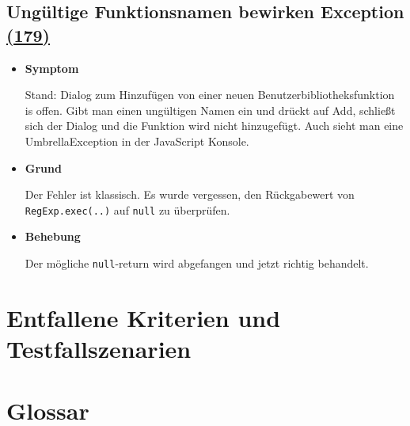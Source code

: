 \documentclass[parskip=full,11pt,twoside]{scrartcl}
\newcommand{\issueref}[1]{
    \href{https://git.scc.kit.edu/ap/Aurora/issues/#1}{(#1)}
}
\newcommand{\regrtest}[5]{
    \subsection{#1 \issueref{#2}}
    \begin{itemize}
        \item \textbf{Symptom}
            #3
        \item \textbf{Grund}
            #4
        \item \textbf{Behebung}
            #5
    \end{itemize}
}
\begin{document}
    \regrtest{Ungültige Funktionsnamen bewirken Exception}{179}{
        Stand: Dialog zum Hinzufügen von einer neuen Benutzerbibliotheksfunktion is offen.
        Gibt man einen ungültigen Namen ein und drückt auf Add, schließt sich der Dialog und die Funktion wird nicht
        hinzugefügt. Auch sieht man eine UmbrellaException in der JavaScript Konsole.
    }{
        Der Fehler ist klassisch. Es wurde vergessen, den Rückgabewert von \texttt{RegExp.exec(..)} auf \texttt{null} zu überprüfen.
    }{
        Der mögliche \texttt{null}-return wird abgefangen und jetzt richtig behandelt.
  }

    \section{Entfallene Kriterien und Testfallszenarien}

    \section{Glossar}
\end{document}
